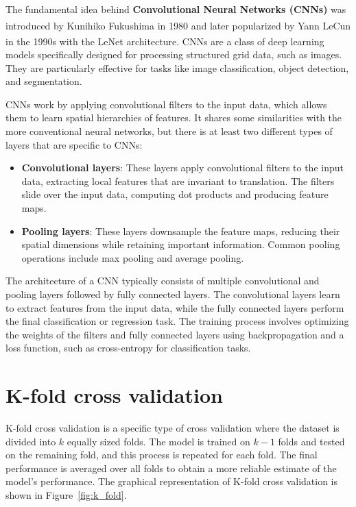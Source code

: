 The fundamental idea behind \textbf{Convolutional Neural Networks (CNNs)} was introduced by Kunihiko Fukushima\textsuperscript{\cite{Fukushima-1987}}
in 1980 and later popularized by Yann LeCun in the 1990s with the LeNet architecture\textsuperscript{\cite{Lecun-et-al-1998}}. CNNs are a class of
deep learning models specifically designed for processing structured grid data, such as images. They are particularly effective for
tasks like image classification, object detection, and segmentation.

CNNs work by applying convolutional filters to the input data, which allows them to learn spatial hierarchies of features.
It shares some similarities with the more conventional neural networks, but there is at least two different types
of layers that are specific to CNNs:

\begin{itemize}
	\item \textbf{Convolutional layers}: These layers apply convolutional filters to the input data, extracting local features
	      that are invariant to translation. The filters slide over the input data, computing dot products and producing feature maps.
	\item \textbf{Pooling layers}: These layers downsample the feature maps, reducing their spatial dimensions while retaining important
	      information. Common pooling operations include max pooling and average pooling.
\end{itemize}

The architecture of a CNN typically consists of multiple convolutional and pooling layers followed by fully connected layers.
The convolutional layers learn to extract features from the input data, while the fully connected layers perform the final classification
or regression task. The training process involves optimizing the weights of the filters and fully connected layers using backpropagation
and a loss function, such as cross-entropy for classification tasks.

\section{K-fold cross validation}
\label{sec:k_fold_cross_validation}

K-fold cross validation is a specific type of cross validation where the dataset is divided into $k$ equally sized folds. The model is trained
on $k-1$ folds and tested on the remaining fold, and this process is repeated for each fold. The final performance is averaged over all folds
to obtain a more reliable estimate of the model's performance. The graphical representation of K-fold cross validation is shown in Figure~\ref{fig:k_fold}.

